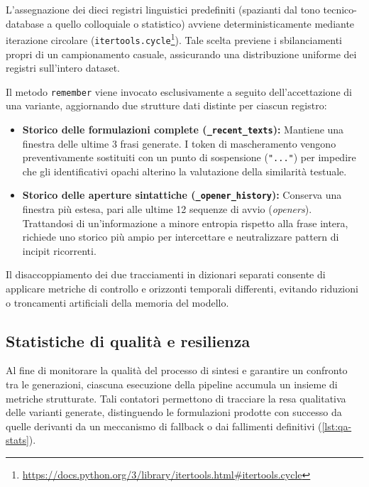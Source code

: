 \documentclass[12pt,a4paper,openright,twoside]{book}
\begin{document}
L'assegnazione dei dieci registri linguistici predefiniti (spazianti dal tono
tecnico-database a quello colloquiale o statistico) avviene deterministicamente
mediante iterazione circolare
(\texttt{itertools.cycle}\footnote{\url{https://docs.python.org/3/library/itertools.html\#itertools.cycle}}).
Tale scelta previene i sbilanciamenti propri di un campionamento casuale,
assicurando una distribuzione uniforme dei registri sull'intero dataset.

Il metodo \texttt{remember} viene invocato esclusivamente a seguito
dell'accettazione di una variante, aggiornando due strutture dati distinte per
ciascun registro:

\begin{itemize}
    \item \textbf{Storico delle formulazioni complete
              (\texttt{\_recent\_texts}):} Mantiene una finestra delle ultime 3
          frasi generate. I token di mascheramento vengono preventivamente
          sostituiti con un punto di sospensione (\texttt{"..."}) per
          impedire che gli identificativi opachi alterino la valutazione
          della similarità testuale.
    \item \textbf{Storico delle aperture sintattiche
              (\texttt{\_opener\_history}):} Conserva una finestra più estesa,
          pari alle ultime 12 sequenze di avvio (\textit{openers}).
          Trattandosi di un'informazione a minore entropia rispetto alla
          frase intera, richiede uno storico più ampio per intercettare e
          neutralizzare pattern di incipit ricorrenti.
\end{itemize}

Il disaccoppiamento dei due tracciamenti in dizionari separati consente di
applicare metriche di controllo e orizzonti temporali differenti, evitando
riduzioni o troncamenti artificiali della memoria del modello.

\subsection{Statistiche di qualità e resilienza}
\label{sec:impl-stats}

Al fine di monitorare la qualità del processo di sintesi e garantire un
confronto tra le generazioni, ciascuna esecuzione della pipeline accumula un
insieme di metriche strutturate. Tali contatori permettono di tracciare la resa
qualitativa delle varianti generate, distinguendo le formulazioni prodotte con
successo da quelle derivanti da un meccanismo di fallback o dai fallimenti
definitivi (\cref{lst:qa-stats}).
\end{document}
